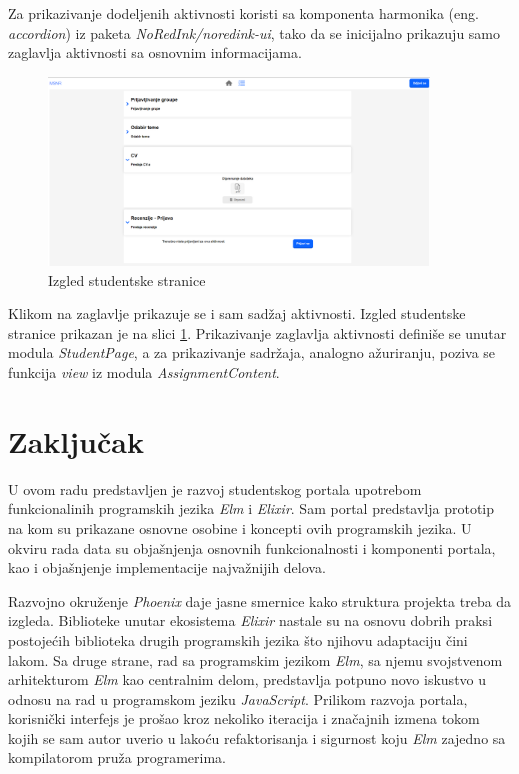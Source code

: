 \documentclass[12pt,oneside]{memoir}
\begin{document}
Za prikazivanje dodeljenih aktivnosti koristi sa komponenta harmonika (eng. \emph{accordion}) iz paketa \emph{NoRedInk/noredink-ui},
tako da se inicijalno prikazuju samo zaglavlja aktivnosti sa osnovnim informacijama.
\begin{figure}[!ht]
  \centering
  \includegraphics[width=0.9\textwidth]{student-page.png}
  \caption{Izgled studentske stranice}
  \label{fig:student-page}
\end{figure}
Klikom na zaglavlje prikazuje se i sam sadžaj aktivnosti. Izgled studentske stranice prikazan je na slici \ref{fig:student-page}.
Prikazivanje zaglavlja aktivnosti definiše se unutar modula \emph{StudentPage}, a za prikazivanje sadržaja, analogno ažuriranju,
poziva se funkcija \emph{view} iz modula \emph{AssignmentContent}.

\chapter{Zaključak}
U ovom radu predstavljen je razvoj studentskog portala upotrebom funkcionalinih
programskih jezika \emph{Elm} i \emph{Elixir}. Sam portal predstavlja prototip na
kom su prikazane osnovne osobine i koncepti ovih programskih jezika. U okviru rada
data su objašnjenja osnovnih funkcionalnosti i komponenti portala, kao i
objašnjenje implementacije najvažnijih delova.

Razvojno okruženje \emph{Phoenix} daje jasne smernice kako struktura projekta treba
da izgleda. Biblioteke unutar ekosistema \emph{Elixir} nastale su na osnovu dobrih
praksi postojećih biblioteka drugih programskih jezika što njihovu adaptaciju
čini lakom. Sa druge strane, rad sa programskim jezikom \emph{Elm}, sa njemu svojstvenom arhitekturom \emph{Elm}
kao centralnim delom, predstavlja potpuno novo iskustvo u odnosu na rad
u programskom jeziku \emph{JavaScript}. Prilikom razvoja portala, korisnički interfejs je prošao
kroz nekoliko iteracija i značajnih izmena tokom kojih se sam autor uverio u lakoću
refaktorisanja i sigurnost koju \emph{Elm} zajedno sa kompilatorom pruža programerima.
\end{document}
